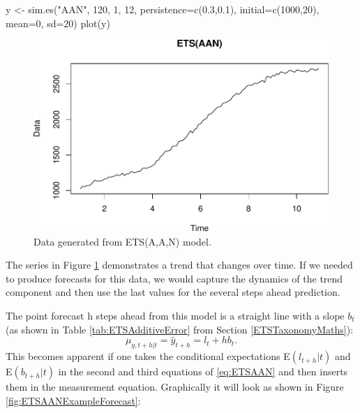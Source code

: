 \documentclass[
]{book}
\newenvironment{Shaded}{\begin{snugshade}}{\end{snugshade}}
\newcommand{\AttributeTok}[1]{\textcolor[rgb]{0.77,0.63,0.00}{#1}}
\newcommand{\DecValTok}[1]{\textcolor[rgb]{0.00,0.00,0.81}{#1}}
\newcommand{\FloatTok}[1]{\textcolor[rgb]{0.00,0.00,0.81}{#1}}
\newcommand{\FunctionTok}[1]{\textcolor[rgb]{0.00,0.00,0.00}{#1}}
\newcommand{\NormalTok}[1]{#1}
\newcommand{\OtherTok}[1]{\textcolor[rgb]{0.56,0.35,0.01}{#1}}
\newcommand{\StringTok}[1]{\textcolor[rgb]{0.31,0.60,0.02}{#1}}
\theoremstyle{definition}
\theoremstyle{definition}
\theoremstyle{definition}
\theoremstyle{definition}
\theoremstyle{remark}
\begin{document}
\begin{Shaded}
\begin{Highlighting}[]
\NormalTok{y }\OtherTok{\textless{}{-}} \FunctionTok{sim.es}\NormalTok{(}\StringTok{"AAN"}\NormalTok{, }\DecValTok{120}\NormalTok{, }\DecValTok{1}\NormalTok{, }\DecValTok{12}\NormalTok{, }\AttributeTok{persistence=}\FunctionTok{c}\NormalTok{(}\FloatTok{0.3}\NormalTok{,}\FloatTok{0.1}\NormalTok{),}
            \AttributeTok{initial=}\FunctionTok{c}\NormalTok{(}\DecValTok{1000}\NormalTok{,}\DecValTok{20}\NormalTok{), }\AttributeTok{mean=}\DecValTok{0}\NormalTok{, }\AttributeTok{sd=}\DecValTok{20}\NormalTok{)}
\FunctionTok{plot}\NormalTok{(y)}
\end{Highlighting}
\end{Shaded}

\begin{figure}
\centering
\includegraphics{Svetunkov--2022----ADAM_files/figure-latex/ETSAANExample-1.pdf}
\caption{\label{fig:ETSAANExample}Data generated from ETS(A,A,N) model.}
\end{figure}

The series in Figure \ref{fig:ETSAANExample} demonstrates a trend that changes over time. If we needed to produce forecasts for this data, we would capture the dynamics of the trend component and then use the last values for the several steps ahead prediction.

The point forecast h steps ahead from this model is a straight line with a slope \(b_t\) (as shown in Table \ref{tab:ETSAdditiveError} from Section \ref{ETSTaxonomyMaths}):
\begin{equation}
    \mu_{y,t+h|t} = \hat{y}_{t+h} = l_{t} + h b_t.
  \label{eq:ETSAANForecast}
\end{equation}
This becomes apparent if one takes the conditional expectations E\((l_{t+h}|t)\) and E\((b_{t+h}|t)\) in the second and third equations of \eqref{eq:ETSAAN} and then inserts them in the measurement equation. Graphically it will look as shown in Figure \ref{fig:ETSAANExampleForecast}:
\end{document}
